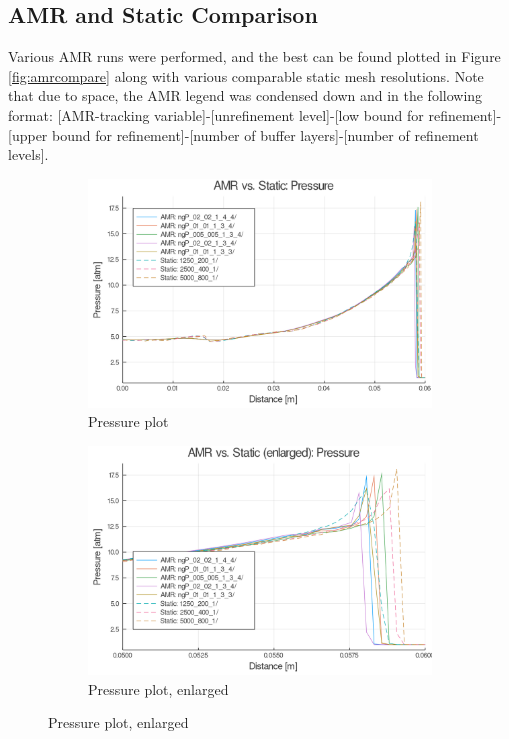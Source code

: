 \subsection{AMR and Static Comparison}
Various AMR runs were performed, and the best can be found plotted in Figure \ref{fig:amrcompare} along with various comparable static mesh resolutions. Note that due to space, the AMR legend was condensed down and in the following format: [AMR-tracking variable]-[unrefinement level]-[low bound for refinement]-[upper bound for refinement]-[number of buffer layers]-[number of refinement levels]. 
\begin{figure}[]
    \centering
    \begin{subfigure}[]{\textwidth}
        \centering
        \includegraphics[width=\textwidth]{./figs/amrfigs/amrcompare/p.png}
        \caption{Pressure plot}
    \end{subfigure}

    \centering
    \begin{subfigure}[]{\textwidth}
        \centering
        \includegraphics[width=\textwidth]{./figs/amrfigs/amrcompare/pe.png}
        \caption{Pressure plot, enlarged}
    \end{subfigure}

\end{figure}
